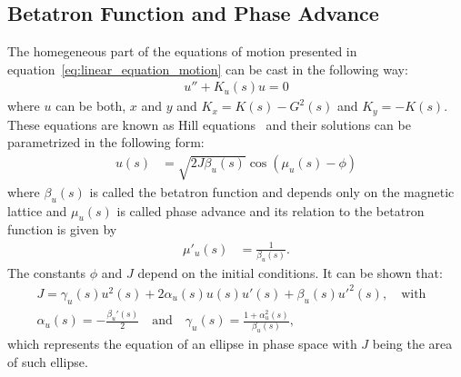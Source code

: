 \subsection{Betatron Function and Phase Advance} \label{ssub:betatron_function}

    The homegeneous part of the equations of motion presented in equation~\eqref{eq:linear_equation_motion} can be cast in the following way:
    \begin{align}
        u'' + K_u(s)u = 0
    \end{align}
    where $u$ can be both, $x$ and $y$ and $K_x=K(s)-G^2(s)$ and $K_y=-K(s)$. These equations are known as Hill equations~\cite{HillEqu} and their solutions can be parametrized in the following form:
	\begin{align} \label{eq:betatron_motion}
		u(s) &= \sqrt{2J\beta_u(s)} \cos(\mu_u(s) - \phi)
	\end{align}
	where $\beta_u(s)$ is called the betatron function and depends only on the magnetic lattice and $\mu_u(s)$ is called phase advance and its relation to the betatron function is given by
	\begin{align}\label{eq:phase_advance}
		\mu'_u(s) &= \frac{1}{\beta_u(s)}.
	\end{align}
	The constants $\phi$ and $J$ depend on the initial conditions. It can be shown that:
	\begin{align} \label{eq:linear_invariant}
		J = \gamma_u(s)u^2(s) + 2\alpha_u(s)u(s)u'(s) + \beta_u(s)u'^2(s),
												\quad \text{with}& \\[3mm]
        \alpha_u(s) = -\frac{\beta_u'(s)}{2} \quad \text{and} \nonumber \quad
		\gamma_u(s) = \frac{1+\alpha_u^2(s)}{\beta_u(s)},
	\end{align}
	which represents the equation of an ellipse in phase space with $J$ being the area of such ellipse.

